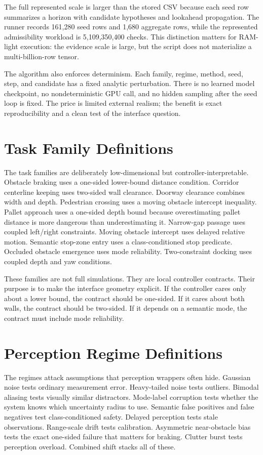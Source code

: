 \documentclass{article}
\newcommand{\fullscale}{5,109,350,400}
\newcommand{\seedrows}{161,280}
\newcommand{\aggrows}{1,680}
\begin{document}
The full represented scale is larger than the stored CSV because each seed row summarizes a horizon with candidate hypotheses and lookahead propagation. The runner records \seedrows{} seed rows and \aggrows{} aggregate rows, while the represented admissibility workload is \fullscale{} checks. This distinction matters for RAM-light execution: the evidence scale is large, but the script does not materialize a multi-billion-row tensor.

The algorithm also enforces determinism. Each family, regime, method, seed, step, and candidate has a fixed analytic perturbation. There is no learned model checkpoint, no nondeterministic GPU call, and no hidden sampling after the seed loop is fixed. The price is limited external realism; the benefit is exact reproducibility and a clean test of the interface question.

\section{Task Family Definitions}

The task families are deliberately low-dimensional but controller-interpretable. Obstacle braking uses a one-sided lower-bound distance condition. Corridor centerline keeping uses two-sided wall clearance. Doorway clearance combines width and depth. Pedestrian crossing uses a moving obstacle intercept inequality. Pallet approach uses a one-sided depth bound because overestimating pallet distance is more dangerous than underestimating it. Narrow-gap passage uses coupled left/right constraints. Moving obstacle intercept uses delayed relative motion. Semantic stop-zone entry uses a class-conditioned stop predicate. Occluded obstacle emergence uses mode reliability. Two-constraint docking uses coupled depth and yaw conditions.

These families are not full simulations. They are local controller contracts. Their purpose is to make the interface geometry explicit. If the controller cares only about a lower bound, the contract should be one-sided. If it cares about both walls, the contract should be two-sided. If it depends on a semantic mode, the contract must include mode reliability.

\section{Perception Regime Definitions}

The regimes attack assumptions that perception wrappers often hide. Gaussian noise tests ordinary measurement error. Heavy-tailed noise tests outliers. Bimodal aliasing tests visually similar distractors. Mode-label corruption tests whether the system knows which uncertainty radius to use. Semantic false positives and false negatives test class-conditioned safety. Delayed perception tests stale observations. Range-scale drift tests calibration. Asymmetric near-obstacle bias tests the exact one-sided failure that matters for braking. Clutter burst tests perception overload. Combined shift stacks all of these.
\end{document}
